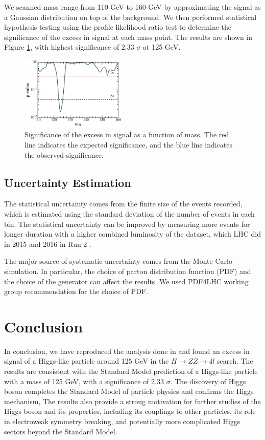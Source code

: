 We scanned mass range from 110 GeV to 160 GeV by approximating the signal as a Gaussian distribution on top of the background. We then performed statistical hypothesis testing using the profile likelihood ratio test to determine the significance of the excess in signal at each mass point. The results are shown in Figure \ref{fig:significance}, with highest significance of 2.33 $\sigma$ at 125 GeV. 
\begin{figure}[h]
  \centering
  \includegraphics[width=0.45\textwidth]{Figures/p-value.png}
  \caption{Significance of the excess in signal as a function of mass. The red line indicates the expected significance, and the blue line indicates the observed significance.}
  \label{fig:significance}
\end{figure}


\subsection{Uncertainty Estimation}

The statistical uncertainty comes from the finite size of the events recorded, which is estimated using the standard deviation of the number of events in each bin. The statistical uncertainty can be improved by measuring more events for longer duration with a higher combined luminosity of the dataset, which LHC did in 2015 and 2016 in Run 2 \cite{ATLAS:2023oaq}. 

The major source of systematic uncertainty comes from the Monte Carlo simulation. In particular, the choice of parton distribution function (PDF) and the choice of the generator can affect the results. We used \textsc{PDF4LHC} working group recommendation \cite{Botje:2011sn,Alekhin:2011sk,Lai:2010vv,Ball:2011mu} for the choice of PDF. 

\section{Conclusion}
In conclusion, we have reproduced the analysis done in \cite{CMS:2012qbp} and found an excess in signal of a Higgs-like particle around 125 GeV in the $H \to ZZ \to 4l$ search. The results are consistent with the Standard Model prediction of a Higgs-like particle with a mass of 125 GeV, with a significance of 2.33 $\sigma$. The discovery of Higgs boson completes the Standard Model of particle physics and confirms the Higgs mechanism, The results also provide a strong motivation for further studies of the Higgs boson and its properties, including its couplings to other particles, its role in electroweak symmetry breaking, and potentially more complicated Higgs sectors beyond the Standard Model.

